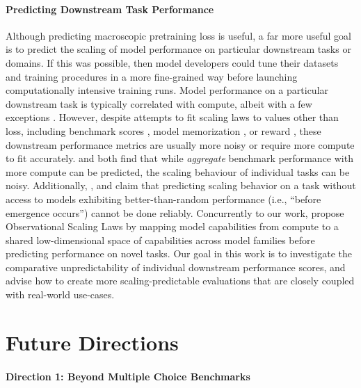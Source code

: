\paragraph{Predicting Downstream Task Performance}

Although predicting macroscopic pretraining loss is useful, a far more useful goal is to predict the scaling of model performance on particular downstream tasks or domains. If this was possible, then model developers could tune their datasets and training procedures in a more fine-grained way before launching computationally intensive training runs. Model performance on a particular downstream task is typically correlated with compute, albeit with a few exceptions \citep{mckenzie2022inverse, huang2024compression}. However, despite attempts to fit scaling laws to values other than loss, including benchmark scores \citep{gadre2024language, zhang2024scalingmeetsllmfinetuning}, model memorization \citep{biderman2023emergent}, or reward \citep{gao2022scaling}, these downstream performance metrics are usually more noisy or require more compute to fit accurately. \citet{owen2024predicting} and \citet{gadre2024language} both find that while \textit{aggregate} benchmark performance with more compute can be predicted, the scaling behaviour of individual tasks can be noisy. Additionally, \citet{owen2024predicting}, \citet{du2024understanding} and \citet{gadre2024language} claim that predicting scaling behavior on a task without access to models exhibiting better-than-random performance (i.e., ``before emergence occurs'') cannot be done reliably. Concurrently to our work, \citet{ruan2024observational} propose Observational Scaling Laws by mapping model capabilities from compute to a shared low-dimensional space of capabilities across model families before predicting performance on novel tasks.
Our goal in this work is to investigate the comparative unpredictability of individual downstream performance scores, and advise how to create more scaling-predictable evaluations that are closely coupled with real-world use-cases.

\section{Future Directions}
\label{app:sec:future_directions}

\paragraph{Direction 1: Beyond Multiple Choice Benchmarks}

